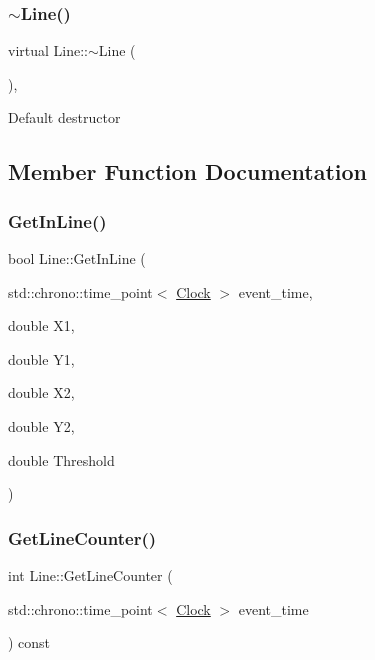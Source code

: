 \mbox{\label{classLine_a4a95bafcefa28672b3999deb011b9e50}} 
\subsubsection{\texorpdfstring{$\sim$\+Line()}{~Line()}}
{\footnotesize\ttfamily virtual Line\+::$\sim$\+Line (\begin{DoxyParamCaption}{ }\end{DoxyParamCaption})\hspace{0.3cm}{\ttfamily [inline]}, {\ttfamily [virtual]}}

Default destructor 

\subsection{Member Function Documentation}
\mbox{\label{classLine_a4c9d571599ebc5e9b6090b54a338fbde}} 
\subsubsection{\texorpdfstring{Get\+In\+Line()}{GetInLine()}}
{\footnotesize\ttfamily bool Line\+::\+Get\+In\+Line (\begin{DoxyParamCaption}\item[{std\+::chrono\+::time\+\_\+point$<$ \mbox{\hyperlink{universe_8h_a0ef8d951d1ca5ab3cfaf7ab4c7a6fd80}{Clock}} $>$}]{event\+\_\+time,  }\item[{double}]{X1,  }\item[{double}]{Y1,  }\item[{double}]{X2,  }\item[{double}]{Y2,  }\item[{double}]{Threshold }\end{DoxyParamCaption})\hspace{0.3cm}{\ttfamily [inline]}}

\mbox{\label{classLine_ac13c6405cfd2a586633b5a5eece05fff}} 
\subsubsection{\texorpdfstring{Get\+Line\+Counter()}{GetLineCounter()}}
{\footnotesize\ttfamily int Line\+::\+Get\+Line\+Counter (\begin{DoxyParamCaption}\item[{std\+::chrono\+::time\+\_\+point$<$ \mbox{\hyperlink{universe_8h_a0ef8d951d1ca5ab3cfaf7ab4c7a6fd80}{Clock}} $>$}]{event\+\_\+time }\end{DoxyParamCaption}) const\hspace{0.3cm}{\ttfamily [inline]}}

